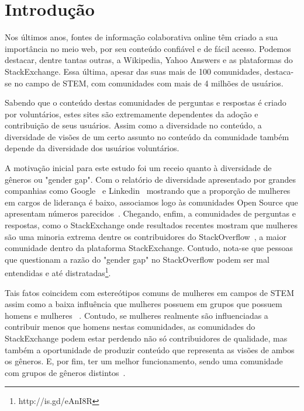 \chapter{Introdução}
\label{sec:introduction}

Nos últimos anos, fontes de informação colaborativa online têm criado a sua importância no meio web, por seu conteúdo confiável e de fácil acesso. Podemos destacar, dentre tantas outras, a Wikipedia, Yahoo Answers e as plataformas do StackExchange. Essa última, apesar das suas mais de 100 comunidades, destaca-se no campo de STEM, com comunidades com mais de 4 milhões de usuários. 

Sabendo que o conteúdo destas comunidades de perguntas e respostas é criado por voluntários, estes sites são extremamente dependentes da adoção e contribuição de seus usuários. Assim como a diversidade no conteúdo, a diversidade de visões de um certo assunto no conteúdo da comunidade também depende da diversidade dos usuários voluntários.

A motivação inicial para este estudo foi um receio quanto à diversidade de gêneros ou "gender gap". Com o relatório de diversidade apresentado por grandes companhias como Google~\cite{google:report} e Linkedin~\cite{linkedin:report} mostrando que a proporção de mulheres em cargos de liderança é baixo, associamos logo às comunidades Open Source que apresentam números parecidos~\cite{rustad2011suck}. Chegando, enfim, a comunidades de perguntas e respostas, como o StackExchange onde resultados recentes mostram que mulheres são uma minoria extrema dentre os contribuidores do StackOverflow~\cite{Vasilescu27092013}, a maior comunidade dentro da plataforma StackExchange. Contudo, nota-se que pessoas que questionam a razão do "gender gap" no StackOverflow podem ser mal entendidas e até distratadas\footnote{http://is.gd/eAnI8R}.

Tais fatos coincidem com estereótipos comuns de mulheres em campos de STEM~\cite{spencer1999stereotype} assim como a baixa influência que mulheres possuem em grupos que possuem homens e mulheres ~\cite{karpowitz2012gender}. Contudo, se mulheres realmente são influenciadas a contribuir menos que homens nestas comunidades, as comunidades do StackExchange podem estar perdendo não só contribuidores de qualidade, mas também a oportunidade de produzir conteúdo que representa as visões de ambos os gêneros. E, por fim, ter um melhor funcionamento, sendo uma comunidade com grupos de gêneros distintos~\cite{marshall1975boys}.

